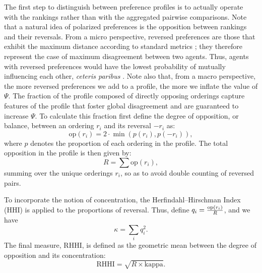 \documentclass[12pt]{article}
\begin{document}
The first step to distinguish between preference profiles is to actually operate
with the rankings rather than with the aggregated pairwise comparisons. Note
that a natural idea of polarized preferences is the opposition between rankings
and their reversals. From a micro perspective, reversed preferences are those
that exhibit the maximum distance according to standard metrics
\parencite{zwicker2016introduction};
they therefore represent the case of maximum disagreement between two agents.
Thus, agents with reversed preferences would have the lowest probability of
mutually influencing each other, \emph{ceteris paribus} \parencite{flache2017, maciel20_ideol_motiv_biases_multip_issues_opinion_model}.
Note also that, from a macro perspective, the more reversed preferences we add
to a profile, the more we inflate the value of \(\Psi\). The fraction of the
profile composed of directly opposing orderings capture features of the profile
that foster global disagreement and are guaranteed to increase \(\Psi\). To
calculate this fraction first define the degree of opposition, or balance,
between an ordering \( r_i \) and its reversal \( -r_i \) as:
\[
\text{op}(r_i) = 2 \cdot \min(p(r_i), p(-r_i)),
\]
where \( p \) denotes the proportion of each ordering in the profile. The total opposition in the profile is then given by:
\[
R = \sum \text{op}(r_i),
\]
summing over the unique orderings \( r_i \), so as to avoid double counting of reversed pairs.

To incorporate the notion of concentration, the Herfindahl–Hirschman Index (HHI) is applied to the proportions of reversal. Thus, define \( q_{i} = {\text{op}(r_i) \over R} \), and we have
\[
\kappa = \sum_{i} q_{i}^{2}.
\]
The final measure, \( \mathrm{RHHI} \), is defined as the geometric mean between the degree of opposition and its concentration:
\[
\mathrm{RHHI} = \sqrt{R \times \mathrm{kappa}}.
\]
\end{document}
